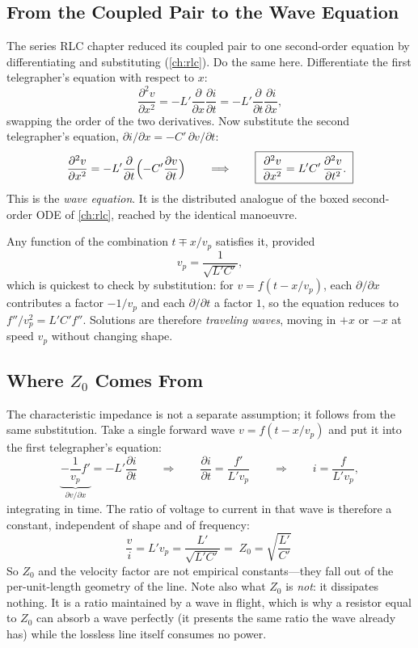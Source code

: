 \subsection{From the Coupled Pair to the Wave Equation}
The series RLC chapter reduced its coupled pair to one second-order equation by
differentiating and substituting (\cref{ch:rlc}). Do the same here. Differentiate
the first telegrapher's equation with respect to \(x\):
\[
\frac{\partial^2 v}{\partial x^2}
=-L'\frac{\partial}{\partial x}\frac{\partial i}{\partial t}
=-L'\frac{\partial}{\partial t}\frac{\partial i}{\partial x},
\]
swapping the order of the two derivatives. Now substitute the second telegrapher's
equation, \(\partial i/\partial x=-C'\,\partial v/\partial t\):
\[
\frac{\partial^2 v}{\partial x^2}
=-L'\frac{\partial}{\partial t}\Bigl(-C'\frac{\partial v}{\partial t}\Bigr)
\qquad\Longrightarrow\qquad
\boxed{\;\frac{\partial^2 v}{\partial x^2}=L'C'\,\frac{\partial^2 v}{\partial t^2}.\;}
\]
This is the \emph{wave equation}. It is the distributed analogue of the boxed
second-order ODE of \cref{ch:rlc}, reached by the identical manoeuvre.

Any function of the combination \(t\mp x/v_p\) satisfies it, provided
\[
v_p=\frac{1}{\sqrt{L'C'}},
\]
which is quickest to check by substitution: for \(v=f(t-x/v_p)\), each
\(\partial/\partial x\) contributes a factor \(-1/v_p\) and each
\(\partial/\partial t\) a factor \(1\), so the equation reduces to
\(f''/v_p^2=L'C'f''\). Solutions are therefore \emph{traveling waves}, moving in
\(+x\) or \(-x\) at speed \(v_p\) without changing shape.

\subsection{Where \texorpdfstring{\(Z_0\)}{Z0} Comes From}
The characteristic impedance is not a separate assumption; it follows from the same
substitution. Take a single forward wave \(v=f(t-x/v_p)\) and put it into the first
telegrapher's equation:
\[
\underbrace{-\frac{1}{v_p}f'}_{\partial v/\partial x}
=-L'\frac{\partial i}{\partial t}
\qquad\Longrightarrow\qquad
\frac{\partial i}{\partial t}=\frac{f'}{L'v_p}
\qquad\Longrightarrow\qquad
i=\frac{f}{L'v_p},
\]
integrating in time. The ratio of voltage to current in that wave is therefore a
constant, independent of shape and of frequency:
\[
\frac{v}{i}=L'v_p=\frac{L'}{\sqrt{L'C'}}
=\boxed{\;Z_0=\sqrt{\frac{L'}{C'}}\;}
\]
So \(Z_0\) and the velocity factor are not empirical constants---they fall out of
the per-unit-length geometry of the line. Note also what \(Z_0\) is \emph{not}: it
dissipates nothing. It is a ratio maintained by a wave in flight, which is why a
resistor equal to \(Z_0\) can absorb a wave perfectly (it presents the same ratio
the wave already has) while the lossless line itself consumes no power.

